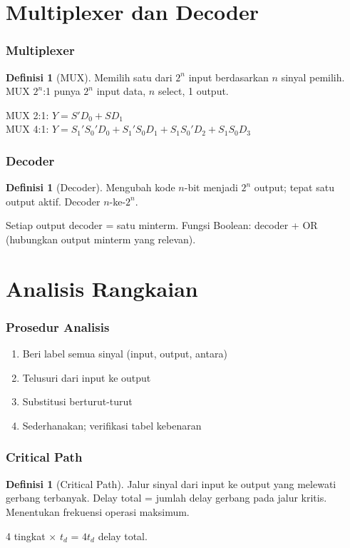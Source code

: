 \documentclass[handout]{beamer}
\theoremstyle{definition}
\newtheorem{definisi}[theorem]{Definisi}
\theoremstyle{example}
\begin{document}
\section{Multiplexer dan Decoder}

\begin{frame}
\frametitle{Multiplexer}
\begin{definisi}[MUX]
Memilih satu dari $2^n$ input berdasarkan $n$ sinyal pemilih. MUX $2^n$:1 punya $2^n$ input data, $n$ select, 1 output.
\end{definisi}
MUX 2:1: $Y = S'D_0 + SD_1$\\
MUX 4:1: $Y = S_1'S_0'D_0 + S_1'S_0 D_1 + S_1 S_0' D_2 + S_1 S_0 D_3$
\end{frame}

\begin{frame}
\frametitle{Decoder}
\begin{definisi}[Decoder]
Mengubah kode $n$-bit menjadi $2^n$ output; tepat satu output aktif. Decoder $n$-ke-$2^n$.
\end{definisi}
Setiap output decoder = satu minterm. Fungsi Boolean: decoder + OR (hubungkan output minterm yang relevan).
\end{frame}

\section{Analisis Rangkaian}

\begin{frame}
\frametitle{Prosedur Analisis}
\begin{enumerate}
  \item Beri label semua sinyal (input, output, antara)
  \item Telusuri dari input ke output
  \item Substitusi berturut-turut
  \item Sederhanakan; verifikasi tabel kebenaran
\end{enumerate}
\end{frame}

\begin{frame}
\frametitle{Critical Path}
\begin{definisi}[Critical Path]
Jalur sinyal dari input ke output yang melewati gerbang terbanyak. Delay total = jumlah delay gerbang pada jalur kritis. Menentukan frekuensi operasi maksimum.
\end{definisi}
4 tingkat $\times$ $t_d$ = $4 t_d$ delay total.
\end{frame}
\end{document}
